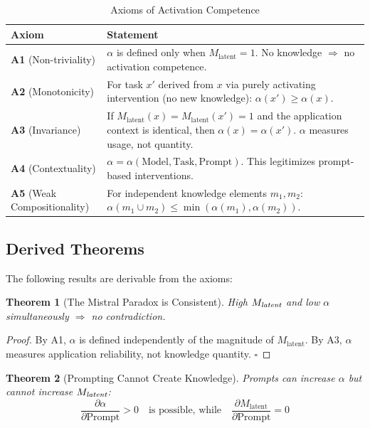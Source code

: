 \documentclass[11pt,a4paper]{article}
\newtheorem{theorem}{Theorem}[section]
\begin{document}
\begin{table}[H]
\centering
\caption{Axioms of Activation Competence}
\begin{tabular}{lp{10cm}}
\toprule
\textbf{Axiom} & \textbf{Statement} \\
\midrule
\textbf{A1} (Non-triviality) & $\alpha$ is defined only when $M_{\text{latent}} = 1$. No knowledge $\Rightarrow$ no activation competence. \\[0.5em]
\textbf{A2} (Monotonicity) & For task $x'$ derived from $x$ via purely activating intervention (no new knowledge): $\alpha(x') \geq \alpha(x)$. \\[0.5em]
\textbf{A3} (Invariance) & If $M_{\text{latent}}(x) = M_{\text{latent}}(x') = 1$ and the application context is identical, then $\alpha(x) = \alpha(x')$. $\alpha$ measures usage, not quantity. \\[0.5em]
\textbf{A4} (Contextuality) & $\alpha = \alpha(\text{Model}, \text{Task}, \text{Prompt})$. This legitimizes prompt-based interventions. \\[0.5em]
\textbf{A5} (Weak Compositionality) & For independent knowledge elements $m_1, m_2$: $\alpha(m_1 \cup m_2) \leq \min(\alpha(m_1), \alpha(m_2))$. \\
\bottomrule
\end{tabular}
\end{table}


\subsection{Derived Theorems}

The following results are derivable from the axioms:

\begin{theorem}[The Mistral Paradox is Consistent]
High $M_{\emph{latent}}$ and low $\alpha$ simultaneously $\Rightarrow$ no contradiction.
\end{theorem}

\begin{proof}
By A1, $\alpha$ is defined independently of the magnitude of $M_{\text{latent}}$. By A3, $\alpha$ measures application reliability, not knowledge quantity. $\square$
\end{proof}

\begin{theorem}[Prompting Cannot Create Knowledge]
Prompts can increase $\alpha$ but cannot increase $M_{\emph{latent}}$:
\begin{equation}
\frac{\partial \alpha}{\partial \text{Prompt}} > 0 \quad \text{is possible, while} \quad \frac{\partial M_{\text{latent}}}{\partial \text{Prompt}} = 0
\end{equation}
\end{theorem}
\end{document}
